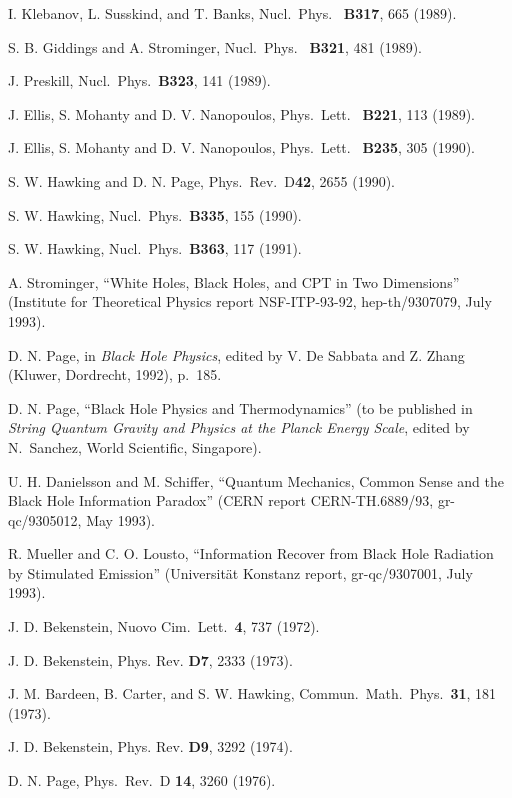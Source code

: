 \documentclass[12pt]{article}
\begin{document}
\begin{thebibliography}{999}
 I. Klebanov, L. Susskind, and T. Banks, Nucl.\ Phys.\
{\bf
B317}, 665 (1989).

 S. B. Giddings and A. Strominger, Nucl.\ Phys.\ {\bf
B321}, 481
(1989).

 J. Preskill, Nucl.\ Phys.\ {\bf B323}, 141 (1989).

 J. Ellis, S. Mohanty and D. V. Nanopoulos, Phys.\
Lett.\ {\bf
B221}, 113 (1989).

 J. Ellis, S. Mohanty and D. V. Nanopoulos, Phys.\
Lett.\ {\bf
B235}, 305 (1990).

 S. W. Hawking and D. N. Page, Phys.\ Rev.\ D{\bf 42},
2655
(1990).

 S. W. Hawking, Nucl.\ Phys.\ {\bf B335}, 155 (1990).

 S. W. Hawking, Nucl.\ Phys.\ {\bf B363}, 117 (1991).

 A. Strominger, ``White Holes, Black Holes, and CPT
in Two Dimensions'' (Institute for Theoretical Physics report
NSF-ITP-93-92, hep-th/9307079, July 1993).

\bibitem{Pag92} D. N. Page, in {\em Black Hole Physics}, edited by V.
De
Sabbata and Z. Zhang (Kluwer, Dordrecht, 1992), p.~185.

 D. N. Page, ``Black Hole Physics and Thermodynamics''
(to be
published in {\em String Quantum Gravity and Physics at the Planck
Energy
Scale}, edited by N.~Sanchez, World Scientific, Singapore).

 U. H. Danielsson and M. Schiffer, ``Quantum
Mechanics,
Common Sense and the Black Hole Information Paradox'' (CERN report
CERN-TH.6889/93, gr-qc/9305012, May 1993).

\bibitem{MulLou} R. Mueller and C. O. Lousto, ``Information Recover
from
Black Hole Radiation by Stimulated Emission'' (Universit\"{a}t
Konstanz report,
gr-qc/9307001, July 1993).

 J. D. Bekenstein, Nuovo Cim.\ Lett.\ {\bf 4},
737 (1972).

\bibitem{Bek73} J. D. Bekenstein,  Phys. Rev. {\bf D7}, 2333 (1973).

 J. M. Bardeen, B. Carter, and S. W. Hawking,
Commun.\ Math.\ Phys.\ {\bf 31}, 181 (1973).

\bibitem{Bek74} J. D. Bekenstein,  Phys. Rev. {\bf D9}, 3292 (1974).

 D. N. Page, Phys.\ Rev.\ D {\bf 14}, 3260 (1976).


\end{thebibliography}
\end{document}
